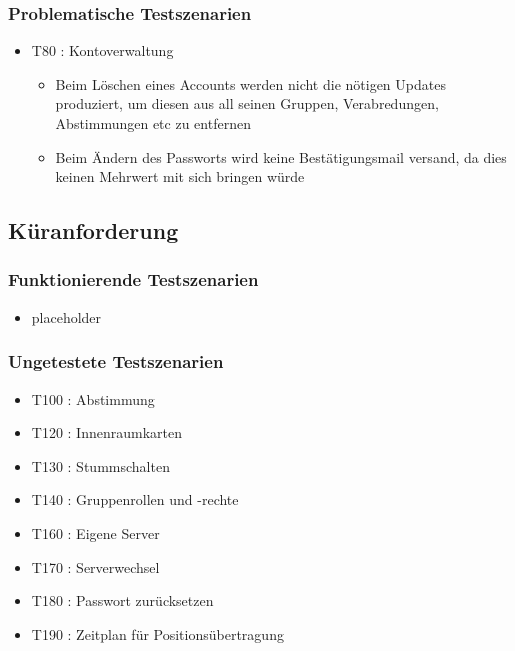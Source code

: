 \documentclass[parskip=full,11pt]{scrartcl}
\begin{document}
	\subsubsection{Problematische Testszenarien}
	\begin{itemize}
		\item T80 : Kontoverwaltung
			\begin{itemize}
			\item Beim Löschen eines Accounts werden nicht die nötigen Updates
			produziert, um diesen aus all seinen Gruppen, Verabredungen, Abstimmungen
			etc zu entfernen
			\item Beim Ändern des Passworts wird keine Bestätigungsmail versand, da
			dies keinen Mehrwert mit sich bringen würde
			\end{itemize}
	\end{itemize}

\subsection{Küranforderung}
	\subsubsection{Funktionierende Testszenarien}
	\begin{itemize}
	\item placeholder
	\end{itemize}

	\subsubsection{Ungetestete Testszenarien}
	\begin{itemize}
		\item T100 : Abstimmung
		\item T120 : Innenraumkarten
		\item T130 : Stummschalten
		\item T140 : Gruppenrollen und -rechte
		\item T160 : Eigene Server
		\item T170 : Serverwechsel
		\item T180 : Passwort zurücksetzen
		\item T190 : Zeitplan für Positionsübertragung
	\end{itemize}
\end{document}
